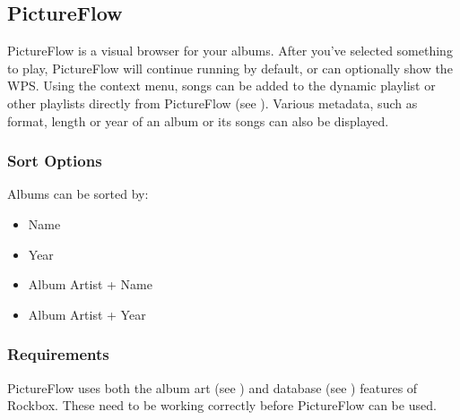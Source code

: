 \subsection{PictureFlow}
PictureFlow is a visual browser for your albums.  After you've selected something to play,
PictureFlow will continue running by default, or can optionally show the WPS. Using
the context menu, songs can be added to the dynamic playlist or other playlists directly
from PictureFlow (see ).
Various metadata, such as format, length or year of an album or its songs can also be
displayed.


\subsubsection{Sort Options}
Albums can be sorted by:

\begin{itemize}
    \item Name
    \item Year
    \item Album Artist + Name
    \item Album Artist + Year
\end{itemize}

\subsubsection{Requirements}
PictureFlow uses both the album art (see ) and
database (see ) features of Rockbox.
These need to be working correctly before PictureFlow can be used.





